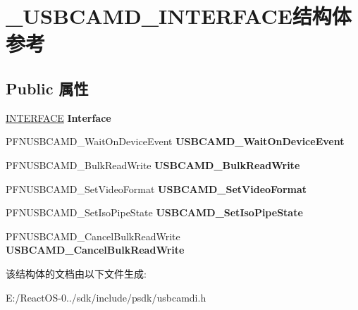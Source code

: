 \hypertarget{struct___u_s_b_c_a_m_d___i_n_t_e_r_f_a_c_e}{}\section{\+\_\+\+U\+S\+B\+C\+A\+M\+D\+\_\+\+I\+N\+T\+E\+R\+F\+A\+C\+E结构体 参考}
\label{struct___u_s_b_c_a_m_d___i_n_t_e_r_f_a_c_e}
\subsection*{Public 属性}
\begin{DoxyCompactItemize}
\item 
\mbox{\label{struct___u_s_b_c_a_m_d___i_n_t_e_r_f_a_c_e_abb19be1a93ee53b83566fc98d1f0ee54}} 
\hyperlink{struct___i_n_t_e_r_f_a_c_e}{I\+N\+T\+E\+R\+F\+A\+CE} {\bfseries Interface}
\item 
\mbox{\label{struct___u_s_b_c_a_m_d___i_n_t_e_r_f_a_c_e_a5fc47f145eb25608ce5bd24be850675c}} 
P\+F\+N\+U\+S\+B\+C\+A\+M\+D\+\_\+\+Wait\+On\+Device\+Event {\bfseries U\+S\+B\+C\+A\+M\+D\+\_\+\+Wait\+On\+Device\+Event}
\item 
\mbox{\label{struct___u_s_b_c_a_m_d___i_n_t_e_r_f_a_c_e_a6e4b4c58ad6c47da151f475301fc5c6d}} 
P\+F\+N\+U\+S\+B\+C\+A\+M\+D\+\_\+\+Bulk\+Read\+Write {\bfseries U\+S\+B\+C\+A\+M\+D\+\_\+\+Bulk\+Read\+Write}
\item 
\mbox{\label{struct___u_s_b_c_a_m_d___i_n_t_e_r_f_a_c_e_ae5f158dd20b844f8405f52782100f460}} 
P\+F\+N\+U\+S\+B\+C\+A\+M\+D\+\_\+\+Set\+Video\+Format {\bfseries U\+S\+B\+C\+A\+M\+D\+\_\+\+Set\+Video\+Format}
\item 
\mbox{\label{struct___u_s_b_c_a_m_d___i_n_t_e_r_f_a_c_e_ab64d5606d5314ceb7e670ac2ed9fba7b}} 
P\+F\+N\+U\+S\+B\+C\+A\+M\+D\+\_\+\+Set\+Iso\+Pipe\+State {\bfseries U\+S\+B\+C\+A\+M\+D\+\_\+\+Set\+Iso\+Pipe\+State}
\item 
\mbox{\label{struct___u_s_b_c_a_m_d___i_n_t_e_r_f_a_c_e_a0b11e5b85599086fbe66a48ca79e692e}} 
P\+F\+N\+U\+S\+B\+C\+A\+M\+D\+\_\+\+Cancel\+Bulk\+Read\+Write {\bfseries U\+S\+B\+C\+A\+M\+D\+\_\+\+Cancel\+Bulk\+Read\+Write}
\end{DoxyCompactItemize}


该结构体的文档由以下文件生成\+:\begin{DoxyCompactItemize}
\item 
E\+:/\+React\+O\+S-\/0../sdk/include/psdk/usbcamdi.\+h\end{DoxyCompactItemize}
